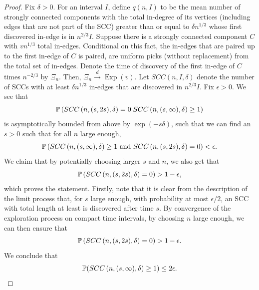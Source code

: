 \begin{proof}
Fix $\delta>0$. For an interval $I$, define $q(n,I)$ to be the mean number of strongly connected components with the total in-degree of its vertices (including edges that are not part of the SCC) greater than or equal to $\delta n^{1/3}$ whose first discovered in-edge is in $n^{2/3}I$. Suppose there is a strongly connected component $C$ with $vn^{1/3}$ total in-edges. Conditional on this fact, the in-edges that are paired up to the first in-edge of $C$ is paired, are uniform picks (without replacement) from the total set of in-edges. Denote the time of discovery of the first in-edge of $C$ times $n^{-2/3}$ by $\Xi_n$. Then, $\Xi_n\overset{d}{\to}\operatorname{Exp}(v)$. Let $SCC(n,I,\delta)$ denote the number of SCCs with at least $\delta n^{1/3}$ in-edges that are discovered in $n^{2/3}I$. Fix $\epsilon>0$. We see that 
$$\P\left(SCC\left(n,(s,2s),\delta\right)=0|SCC\left(n,(s,\infty),\delta\right)\geq 1\right)$$
is asymptotically bounded from above by 
$\exp(-s\delta)$, such that we can find an $s>0$ such that for all $n$ large enough,
$$\P\left(SCC\left(n,(s,\infty),\delta\right)\geq 1 \text{ and }SCC\left(n,(s,2s),\delta\right)=0\right)<\epsilon.$$
We claim that by potentially choosing larger $s$ and $n$, we also get that 
$$\P\left(SCC\left(n,(s,2s),\delta\right)=0\right)>1-\epsilon,$$
which proves the statement.
Firstly, note that it is clear from the description of the limit process that, for $s$ large enough, with probability at most $\epsilon/2$, an SCC with total length at least  is discovered after time $s$. By convergence of the exploration process on compact time intervals, by choosing $n$ large enough, we can then ensure that 
$$\P\left(SCC\left(n,(s,2s),\delta\right)=0\right)>1-\epsilon.$$
We conclude that 
$$\P(SCC\left(n,(s,\infty),\delta\right)\geq 1)\leq 2\epsilon.$$




\end{proof}
